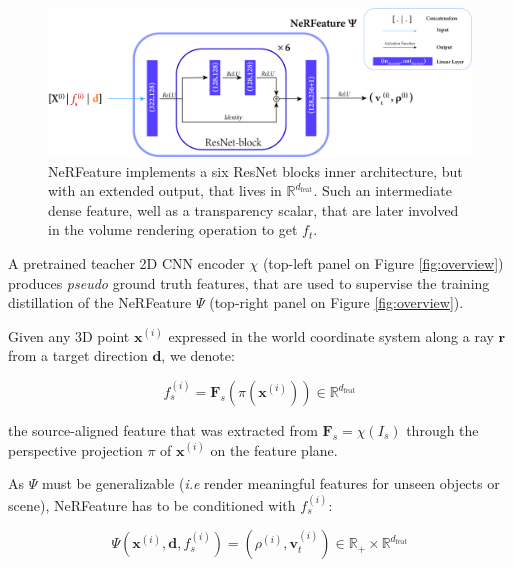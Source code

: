 \begin{figure}[h!]
    \begin{center}
  \includegraphics[width=\linewidth]{images/epinerf/supp_nerfeature.png}
  \caption{NeRFeature implements a six ResNet blocks inner architecture, but with an extended output, that lives in $\mathbb{R}^{d_{\text{feat}}}$. Such an intermediate dense feature, well as a transparency scalar, that are later involved in the volume rendering operation to get $f_{t}$. }
  \label{fig:supp_nerfeature}
  \end{center}
\end{figure}


A pretrained teacher 2D CNN encoder $\chi$ (top-left panel on Figure \ref{fig:overview}) produces \textit{pseudo} ground truth features, that are used to supervise the training distillation of the NeRFeature $\Psi$ (top-right panel on Figure \ref{fig:overview}).

Given any 3D point $\mathbf{x}^{(i)}$ expressed in the world coordinate system along a ray $\mathbf{r}$ from a target direction $\mathbf{d}$, we denote: 

\begin{equation}
    f_{s}^{(i)} = \mathbf{F}_{s}(\pi(\mathbf{x}^{(i)}))  \in \mathbb{R}^{d_{\text{feat}}} 
    \label{eq:projection}
\end{equation}

the source-aligned feature that was extracted from $\mathbf{F}_{s}=\chi(I_{s})$ through the perspective projection $\pi$ of $\mathbf{x}^{(i)}$ on the feature plane.

As $\Psi$ must be generalizable (\textit{i.e} render meaningful features for unseen objects or scene), NeRFeature has to be conditioned with $f_{s}^{(i)}$: 

\begin{equation}
    \Psi(\mathbf{x}^{(i)},\mathbf{d},f_{s}^{(i)}) = (\rho^{(i)},\mathbf{v}_{t}^{(i)}) \in \mathbb{R}_{+}\times \mathbb{R}^{d_{\text{feat}}}
\end{equation}


